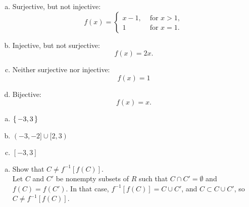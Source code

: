 \documentclass[12pt]{scrartcl} %
\begin{document}
\begin{enumerate}[(a)]
\item Surjective, but not injective:
\begin{equation}
f(x) = 
\begin{cases}
x - 1, & \text{ for } x > 1, \\
1 & \text{ for } x = 1.

\end{cases}
\end{equation}

\item Injective, but not surjective:
\begin{equation}
f(x) = 2x.
\end{equation}
\item Neither surjective nor injective:
\begin{equation}
f(x) = 1
\end{equation}
\item Bijective:
\begin{equation}
f(x) = x.
\end{equation}
\end{enumerate}
\begin{enumerate}[(a)]
\item $\set{-3, 3}$
\item $(-3, -2] \cup [2, 3)$
\item $[-3, 3]$
\end{enumerate}


\begin{enumerate}[(a)]
\item Show that $C \neq f^{-1}[f(C)]$. \\
Let $C$  and $C'$ be nonempty subsets of $R$ such that $C \cap C' = \emptyset$ and $f(C) = f(C')$. In that case, $f^{-1}[f(C)] = C \cup C'$, and $C \subset C \cup C'$, so $C \neq f^{-1}[f(C)]$.

\end{enumerate}
\end{document}
